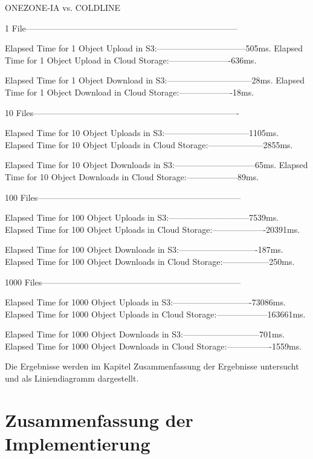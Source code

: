 \begin{code}
ONEZONE-IA vs. COLDLINE

1 File---------------------------------------------------------------------------

Elapsed Time for 1  Object Upload in S3:--------------------------------505ms.
Elapsed Time for 1 Object Upload in Cloud Storage:----------------------636ms.

Elapsed Time for 1 Object Download in S3:------------------------------28ms.
Elapsed Time for 1 Object Download in Cloud Storage:-------------------18ms.

10 Files-------------------------------------------------------------------------

Elapsed Time for 10  Object Uploads in S3:------------------------------1105ms.
Elapsed Time for 10 Object Uploads in Cloud Storage:--------------------2855ms.

Elapsed Time for 10 Object Downloads in S3:-----------------------------65ms.
Elapsed Time for 10 Object Downloads in Cloud Storage:------------------89ms.

100 Files------------------------------------------------------------------------

Elapsed Time for 100  Object Uploads in S3:-----------------------------7539ms.
Elapsed Time for 100 Object Uploads in Cloud Storage:-------------------20391ms.

Elapsed Time for 100 Object Downloads in S3:----------------------------187ms.
Elapsed Time for 100 Object Downloads in Cloud Storage:-----------------250ms.

1000 Files-----------------------------------------------------------------------

Elapsed Time for 1000  Object Uploads in S3:----------------------------73086ms.
Elapsed Time for 1000 Object Uploads in Cloud Storage:------------------163661ms.

Elapsed Time for 1000 Object Downloads in S3:---------------------------701ms.
Elapsed Time for 1000 Object Downloads in Cloud Storage:----------------1559ms.
\end{code}

Die Ergebnisse werden im Kapitel Zusammenfassung der Ergebnisse untersucht und als Liniendiagramm dargestellt.

\newpage

\section{Zusammenfassung der Implementierung}

